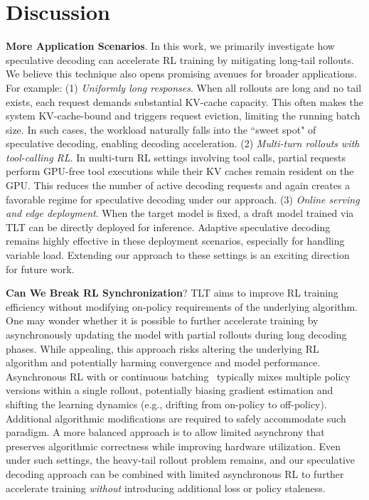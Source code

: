 \documentclass[sigplan,screen]{acmart}
\newcommand{\SysName}{\textrm{TLT}\xspace}
\begin{document}
\vspace{-5pt}
\section{Discussion}
\label{sec_discussion}

\noindent\textbf{More Application Scenarios}. 
In this work, we primarily investigate how speculative decoding can accelerate RL training by mitigating long-tail rollouts. We believe this technique also opens promising avenues for broader applications. For example:
(1) \textit{Uniformly long responses}. When all rollouts are long and no tail exists, each request demands substantial KV-cache capacity. This often makes the system KV-cache-bound and triggers request eviction, limiting the running batch size. In such cases, the workload naturally falls into the “sweet spot" of speculative decoding, enabling decoding acceleration.
(2) \textit{Multi-turn rollouts with tool-calling RL}. In multi-turn RL settings involving tool calls, partial requests perform GPU-free tool executions while their KV caches remain resident on the GPU. This reduces the number of active decoding requests and again creates a favorable regime for speculative decoding under our approach.
(3) \textit{Online serving and edge deployment}. When the target model is fixed, a draft model trained via \SysName can be directly deployed for inference. Adaptive speculative decoding remains highly effective in these deployment scenarios, especially for handling variable load. Extending our approach to these settings is an exciting direction for future work. 


\noindent\textbf{Can We Break RL Synchronization}?
\SysName aims to improve RL training efficiency without modifying on-policy requirements of the underlying algorithm.
One may wonder whether it is possible to further accelerate training by asynchronously updating the model with partial rollouts during long decoding phases. While appealing, this approach risks altering the underlying RL algorithm and potentially harming convergence and model performance. Asynchronous RL with or continuous batching~\cite{AReaL} typically mixes multiple policy versions within a single rollout, potentially biasing gradient estimation and shifting the learning dynamics (e.g., drifting from on-policy to off-policy). Additional algorithmic modifications are required to safely accommodate such paradigm. A more balanced approach is to allow limited asynchrony that preserves algorithmic correctness while improving hardware utilization. Even under such settings, the heavy-tail rollout problem remains, and our speculative decoding approach can be combined with limited asynchronous RL to further accelerate training \emph{without} introducing additional loss or policy staleness.
\end{document}
